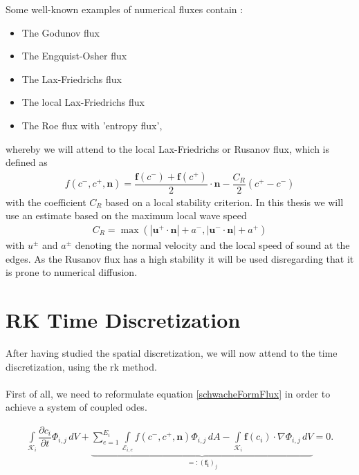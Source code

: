 		Some well-known examples of numerical fluxes contain \cite{Cockburn1998}:
		\begin{itemize}
			\item The Godunov flux 
			\item The Engquist-Osher flux
			\item The Lax-Friedrichs flux
			\item The local Lax-Friedrichs flux
			\item The Roe flux with 'entropy flux',
		\end{itemize}
		whereby we will attend to the local Lax-Friedrichs or Rusanov flux, which is defined as
		\begin{align}
			f(c^-, c^+, \mathbf{n}) = \dfrac{\mathbf{f}(c^-)+\mathbf{f}(c^+)}{2} \cdot \mathbf{n} -\dfrac{C_R}{2}(c^+-c^-)
		\end{align}
		with the coefficient $C_R$ based on a local stability criterion. In this thesis we will use an estimate based on the maximum local wave speed
		\begin{align}
			C_R = \max(|\mathbf{u^+}\cdot \mathbf{n}|+a^-,|\mathbf{u^-}\cdot \mathbf{n}|+a^+)
		\end{align}
		with $u^\pm$ and $a^\pm$ denoting the normal velocity and the local speed of sound at the edges.
		As the Rusanov flux has a high stability it will be used disregarding that it is prone to numerical diffusion.
		
	\section{RK Time Discretization}
	After having studied the spatial discretization, we will now attend to the time discretization, using the \gls{rk} method.\\\\

	First of all, we need to reformulate equation \eqref{schwacheFormFlux} in order to achieve a system of coupled \gls{ode}s.
	
	\begin{align*}
		\int\limits_{\mathcal{K}_i} \dfrac{\partial c_i}{\partial t}\Phi_{i,j} \, dV +
		\underbrace{\sum_{e=1}^{E_i}\int\limits_{\mathcal{E}_{i,e}} f \left( c^-, c^+, \mathbf{n} \right) \Phi_{i,j} \, dA - \int\limits_{\mathcal{K}_i} \boldsymbol{f}\left(c_i\right) \cdot \nabla\Phi_{i,j} \, dV}_{=:(\mathbf{f_i})_j} = 0.
	\end{align*}
	
